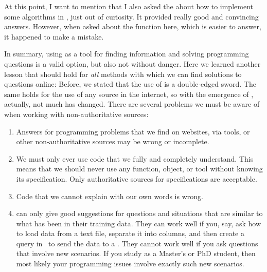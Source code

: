 \begin{noglslink}
At this point, I want to mention that I also asked the  about how to implement some algorithms in \python, just out of curiosity.
It provided really good and convincing answers.
However, when asked about the  function here, which is easier to answer, it happened to make a mistake.

In summary, using  as a tool for finding information and solving programming questions is a valid option, but also not without danger.
Here we learned another lesson that should hold for \emph{all} methods with which we can find solutions to questions online:%
%
%
%
Before, we stated that the use of  is a double-edged sword.
The same holds for the use of any source in the internet, so with the emergence of , actually, not much has changed.
There are several problems we must be aware of when working with non-authoritative sources:%
%
\begin{enumerate}%
%
\item Answers for programming problems that we find on websites, via  tools, or other non-authoritative sources may be wrong or incomplete.%
%
\item We must only ever use code that we fully and completely understand. %
This means that we should never use any function, object, or tool without knowing its specification. %
Only authoritative sources for specifications are acceptable.%
%
\item Code that we cannot explain with our own words is wrong.%
%
\item {} can only give good suggestions for questions and situations that are similar to what has been in their training data. %
They can work well if you, say, ask how to load data from a text file, separate it into columns, and then create a  query in \sql\ to send the data to a \dbms. %
They cannot work well if you ask questions that involve new scenarios. %
If you study as a Master's or PhD student, then most likely your programming issues involve exactly such new scenarios. %

\end{enumerate}
\end{noglslink}
